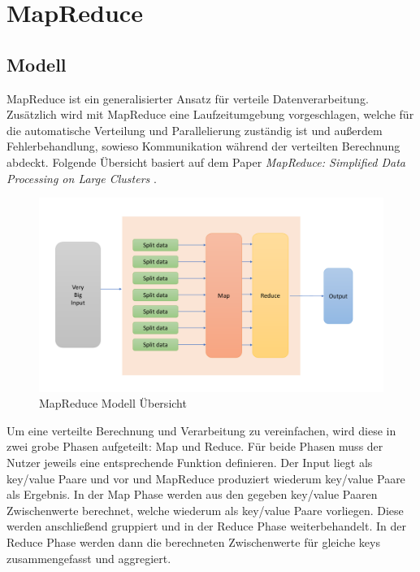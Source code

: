 

\chapter{MapReduce}
\label{MapReduce}

\section{Modell}

MapReduce ist ein generalisierter Ansatz für verteile Datenverarbeitung.
Zusätzlich wird mit MapReduce eine Laufzeitumgebung vorgeschlagen, welche für die automatische Verteilung und Parallelierung zuständig ist und außerdem Fehlerbehandlung, sowieso Kommunikation während der verteilten Berechnung abdeckt.
Folgende Übersicht basiert auf dem Paper \textit{MapReduce: Simplified Data Processing on Large Clusters} \cite{mapReduce}.


\begin{figure}[H]
	\includegraphics[width=\textwidth]{pics/mapReduce/overview}
	\caption{MapReduce Modell Übersicht}
\end{figure}


Um eine verteilte Berechnung und Verarbeitung zu vereinfachen, wird diese in zwei grobe Phasen aufgeteilt: Map und Reduce.
Für beide Phasen muss der Nutzer jeweils eine entsprechende Funktion definieren.
Der Input liegt als key/value Paare und vor und MapReduce produziert wiederum key/value Paare als Ergebnis.
In der Map Phase werden aus den gegeben key/value Paaren Zwischenwerte berechnet, welche wiederum als key/value Paare vorliegen. Diese werden anschließend gruppiert und in der Reduce Phase weiterbehandelt.
In der Reduce Phase werden dann die berechneten Zwischenwerte für gleiche keys zusammengefasst und aggregiert.


